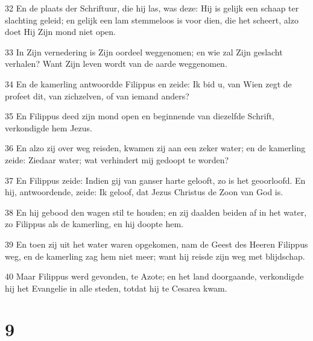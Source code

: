 \par 32 En de plaats der Schriftuur, die hij las, was deze: Hij is gelijk een schaap ter slachting geleid; en gelijk een lam stemmeloos is voor dien, die het scheert, alzo doet Hij Zijn mond niet open.
\par 33 In Zijn vernedering is Zijn oordeel weggenomen; en wie zal Zijn geslacht verhalen? Want Zijn leven wordt van de aarde weggenomen.
\par 34 En de kamerling antwoordde Filippus en zeide: Ik bid u, van Wien zegt de profeet dit, van zichzelven, of van iemand anders?
\par 35 En Filippus deed zijn mond open en beginnende van diezelfde Schrift, verkondigde hem Jezus.
\par 36 En alzo zij over weg reisden, kwamen zij aan een zeker water; en de kamerling zeide: Ziedaar water; wat verhindert mij gedoopt te worden?
\par 37 En Filippus zeide: Indien gij van ganser harte gelooft, zo is het geoorloofd. En hij, antwoordende, zeide: Ik geloof, dat Jezus Christus de Zoon van God is.
\par 38 En hij gebood den wagen stil te houden; en zij daalden beiden af in het water, zo Filippus als de kamerling, en hij doopte hem.
\par 39 En toen zij uit het water waren opgekomen, nam de Geest des Heeren Filippus weg, en de kamerling zag hem niet meer; want hij reisde zijn weg met blijdschap.
\par 40 Maar Filippus werd gevonden, te Azote; en het land doorgaande, verkondigde hij het Evangelie in alle steden, totdat hij te Cesarea kwam.

\chapter{9}

